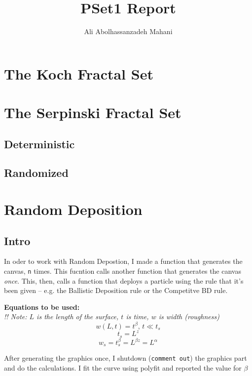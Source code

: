 \documentclass[12pt]{article}
\title{PSet1 Report}
\author{Ali Abolhassanzadeh Mahani}
\begin{document}
	\maketitle
	\section{The Koch Fractal Set}
	\section{The Serpinski Fractal Set}
		\subsection{Deterministic}
		\subsection{Randomized}
	\section{Random Deposition}
	\subsection{Intro}
	In oder to work with Random Depostion, I made a function that generates the canvas,
	\texttt{n} times. This fucntion calls another function that generates the canvas
	\emph{once}. This, then, calls a function that deploys a particle using the rule that it's been
	given -- e.g. the Ballistic Deposition rule or the Competitve BD rule.
	
	\textbf{Equations to be used:}\\
	\emph{!! Note: $L$ is the length of the surface, $t$ is time, $w$ is width (roughness)}
	\begin{equation}
		w(L, t) = t^{\beta}, \, t \ll t_s
		\label{eq:beta}
	\end{equation}
	\begin{equation}
		t_s = L^z
		\label{eq:z}
	\end{equation}
	\begin{equation}
		w_s = t_s^\beta = L^{\beta z} = L^\alpha
		\label{eq:alpha}
	\end{equation}
	
	After generating the graphics once, I shutdown (\texttt{comment out}) the graphics part and do the calculations. I fit the curve using polyfit and reported the value for $\beta$
\end{document}
